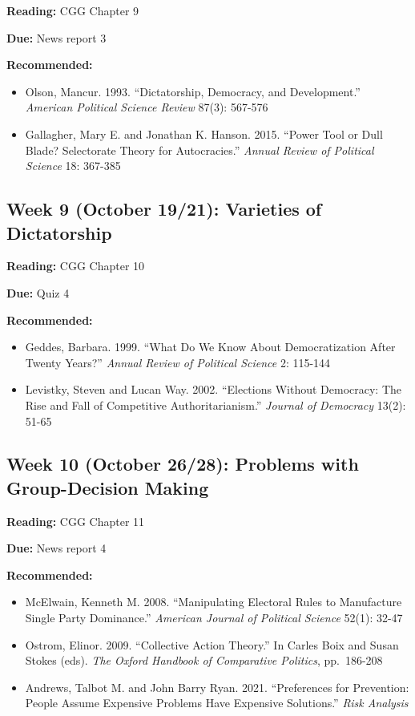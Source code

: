 \documentclass[
  11pt,
]{article}
\providecommand{\tightlist}{%
  \setlength{\itemsep}{0pt}\setlength{\parskip}{0pt}}
\begin{document}
\textbf{Reading:} CGG Chapter 9

\textbf{Due:} News report 3

\textbf{Recommended:}

\begin{itemize}
\tightlist
\item
  Olson, Mancur. 1993. ``Dictatorship, Democracy, and Development.''
  \emph{American Political Science Review} 87(3): 567-576
\item
  Gallagher, Mary E. and Jonathan K. Hanson. 2015. ``Power Tool or Dull
  Blade? Selectorate Theory for Autocracies.'' \emph{Annual Review of
  Political Science} 18: 367-385
\end{itemize}

\hypertarget{week-9-october-1921-varieties-of-dictatorship}{%
\subsection{Week 9 (October 19/21): Varieties of
Dictatorship}\label{week-9-october-1921-varieties-of-dictatorship}}

\textbf{Reading:} CGG Chapter 10

\textbf{Due:} Quiz 4

\textbf{Recommended:}

\begin{itemize}
\tightlist
\item
  Geddes, Barbara. 1999. ``What Do We Know About Democratization After
  Twenty Years?'' \emph{Annual Review of Political Science} 2: 115-144
\item
  Levistky, Steven and Lucan Way. 2002. ``Elections Without Democracy:
  The Rise and Fall of Competitive Authoritarianism.'' \emph{Journal of
  Democracy} 13(2): 51-65
\end{itemize}

\hypertarget{week-10-october-2628-problems-with-group-decision-making}{%
\subsection{Week 10 (October 26/28): Problems with Group-Decision
Making}\label{week-10-october-2628-problems-with-group-decision-making}}

\textbf{Reading:} CGG Chapter 11

\textbf{Due:} News report 4

\textbf{Recommended:}

\begin{itemize}
\tightlist
\item
  McElwain, Kenneth M. 2008. ``Manipulating Electoral Rules to
  Manufacture Single Party Dominance.'' \emph{American Journal of
  Political Science} 52(1): 32-47
\item
  Ostrom, Elinor. 2009. ``Collective Action Theory.'' In Carles Boix and
  Susan Stokes (eds). \emph{The Oxford Handbook of Comparative
  Politics}, pp.~186-208
\item
  Andrews, Talbot M. and John Barry Ryan. 2021. ``Preferences for
  Prevention: People Assume Expensive Problems Have Expensive
  Solutions.'' \emph{Risk Analysis}
\end{itemize}
\end{document}
